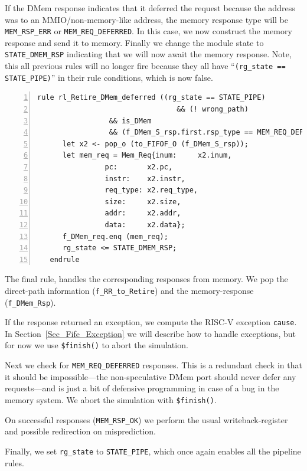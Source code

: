 If the DMem response indicates that it deferred the request because
the address was to an MMIO/non-memory-like address, the memory
response type will be \verb|MEM_RSP_ERR| or \verb|MEM_REQ_DEFERRED|.
In this case, we now construct the memory response and send it to
memory.  Finally we change the module state to \verb|STATE_DMEM_RSP|
indicating that we will now await the memory response.  Note, this all
previous rules will no longer fire because they all have
``\verb|(rg_state == STATE_PIPE)|'' in their rule conditions, which is
now false.

{\small
\begin{Verbatim}[frame=single, numbers=left, label=(In file:src\_Fife/S5\_Retire.bsv)]
   rule rl_Retire_DMem_deferred ((rg_state == STATE_PIPE)
                                 && (! wrong_path)
				 && is_DMem
				 && (f_DMem_S_rsp.first.rsp_type == MEM_REQ_DEFERRED));
      let x2 <- pop_o (to_FIFOF_O (f_DMem_S_rsp));
      let mem_req = Mem_Req{inum:     x2.inum,
			    pc:       x2.pc,
			    instr:    x2.instr,
			    req_type: x2.req_type,
			    size:     x2.size,
			    addr:     x2.addr,
			    data:     x2.data};
      f_DMem_req.enq (mem_req);
      rg_state <= STATE_DMEM_RSP;
   endrule
\end{Verbatim}
}

The final rule, handles the corresponding responses from memory.  We
pop the direct-path information (\verb|f_RR_to_Retire|) and the
memory-response (\verb|f_DMem_Rsp|).

If the response returned an exception, we compute the RISC-V exception
\verb|cause|.  In Section~\ref{Sec_Fife_Exception} we will describe how
to handle exceptions, but for now we use \verb|$finish()| to abort the
simulation.

Next we check for \verb|MEM_REQ_DEFERRED| responses.  This is a
redundant check in that it should be impossible---the non-speculative
DMem port should never defer any requests---and is just a bit of
defensive programming in case of a bug in the memory system.  We abort
the simulation with \verb|$finish()|.

On successful responses (\verb|MEM_RSP_OK|) we perform the usual
writeback-register and possible redirection on misprediction.

Finally, we set \verb|rg_state| to \verb|STATE_PIPE|, which once again
enables all the pipeline rules.

